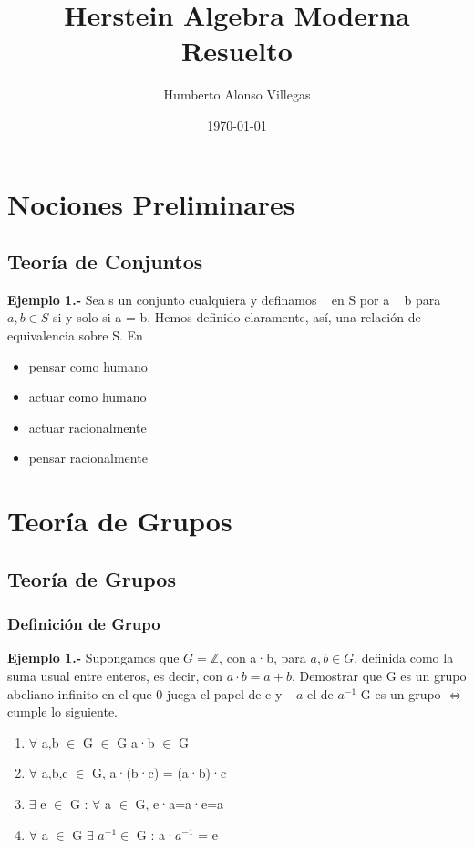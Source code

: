 \documentclass[10pt,a4paper,oneside]{article}
\title{Herstein Algebra Moderna\\Resuelto} %
\author{Humberto Alonso Villegas} %
\date{\today} %
\begin{document}
	\maketitle %
	\newpage
	
	\chapter{Nociones Preliminares}
		\section[''Teoría de Conjuntos'']{Teoría de Conjuntos}
			\textbf{Ejemplo 1.-} Sea s un conjunto cualquiera y definamos ~ en S por a ~ b para $a, b \in S $ si y solo si a = b. Hemos definido claramente, así, una relación de equivalencia sobre S. En 
			
			\begin{itemize}
			\item pensar como humano
			\item actuar como humano
			\item actuar racionalmente
			\item pensar racionalmente
			\end {itemize}
			\newpage
	\newpage



	\chapter{Teoría de Grupos}
		\section["Teoría de"]{Teoría de Grupos}
			\subsection{Definición de Grupo}
				\textbf{Ejemplo 1.-} Supongamos que $G = \mathbb{Z}$, con a·b, para $a,b\in G$, definida como la suma usual entre enteros, es decir, con $a·b=a+b$. Demostrar que G es un grupo abeliano infinito en el que 0 juega el papel de e y $-a$ el de $a^{-1}$
				G es un grupo $\iff$ cumple lo siguiente.
				\begin{enumerate}
					\item $\forall$ a,b $\in$ G $\in$ G a·b $\in$ G
					\item $\forall$ a,b,c $\in$ G, a·(b·c) = (a·b)·c
					\item $\exists$ e $\in$ G : $\forall$ a $\in$ G, e·a=a·e=a
					\item $\forall$ a $\in$ G $\exists$ $a^{-1} \in$ G : a·$a^{-1}$ = e
				\end{enumerate}
\end{document}
